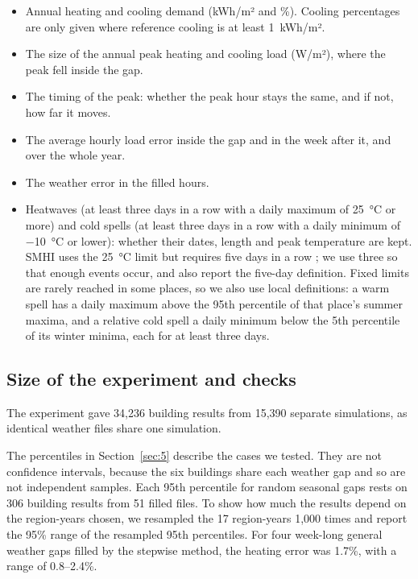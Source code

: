 \begin{itemize}
\item
  Annual heating and cooling demand (kWh/m² and \%). Cooling percentages are only given where reference cooling is at least 1~kWh/m².
\item
  The size of the annual peak heating and cooling load (W/m²), where the peak fell inside the gap.
\item
  The timing of the peak: whether the peak hour stays the same, and if not, how far it moves.
\item
  The average hourly load error inside the gap and in the week after it, and over the whole year.
\item
  The weather error in the filled hours.
\item
  Heatwaves (at least three days in a row with a daily maximum of 25~°C or more) and cold spells (at least three days in a row with a daily minimum of −10~°C or lower): whether their dates, length and peak temperature are kept. SMHI uses the 25~°C limit but requires five days in a row \citep{smhi2026b}; we use three so that enough events occur, and also report the five-day definition. Fixed limits are rarely reached in some places, so we also use local definitions: a warm spell has a daily maximum above the 95th percentile of that place's summer maxima, and a relative cold spell a daily minimum below the 5th percentile of its winter minima, each for at least three days.
\end{itemize}

\subsection{Size of the experiment and checks}\label{sec:4.6}

The experiment gave 34,236 building results from 15,390 separate simulations, as identical weather files share one simulation.

The percentiles in Section~\ref{sec:5} describe the cases we tested. They are not confidence intervals, because the six buildings share each weather gap and so are not independent samples. Each 95th percentile for random seasonal gaps rests on 306 building results from 51 filled files. To show how much the results depend on the region-years chosen, we resampled the 17 region-years 1,000 times and report the 95\% range of the resampled 95th percentiles. For four week-long general weather gaps filled by the stepwise method, the heating error was 1.7\%, with a range of 0.8--2.4\%.

